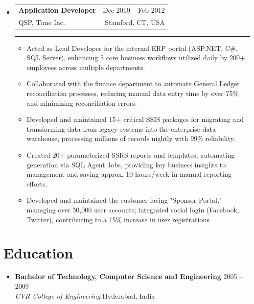 \documentclass[12pt]{article}
\makeatletter
\newcommand{\CompanyFour}{QSP, Time Inc.}
\newcommand{\CollegeName}{CVR College of Engineering}
\newcommand{\resumeItem}[1]{
  \item\small{
    {#1 \vspace{-2pt}}
  }
}
\newcommand{\resumeSubheading}[4]{
  \item %
    \begin{tabular*}{0.97\textwidth}[t]{l@{\extracolsep{\fill}}r}
       {\textbf{#1}} & \small{#2} \\ 
       {\small#3} & \small {#4} \\ 
    \end{tabular*} \vspace{2pt} %
    \noindent\rule{0.97\textwidth}{0.4pt} \vspace{-4pt} %
}
\newcommand{\resumeItemListStart}{\begin{itemize}[leftmargin=0.25in]} %
\newcommand{\resumeItemListEnd}{\end{itemize}\vspace{-5pt}}
\makeatother
\begin{document}
\begin{itemize}[leftmargin=0in, label={}]
    \resumeSubheading
      {Application Developer}{Dec 2010 – Feb 2012}
      {{\CompanyFour}}{Stamford, CT, USA}
      \resumeItemListStart
        \resumeItem{Acted as Lead Developer for the internal ERP portal (ASP.NET, C\#, SQL Server), enhancing 5 core business workflows utilized daily by 200+ employees across multiple departments.}
        \resumeItem{Collaborated with the finance department to automate General Ledger reconciliation processes, reducing manual data entry time by over 75\% and minimizing reconciliation errors.}
        \resumeItem{Developed and maintained 15+ critical SSIS packages for migrating and transforming data from legacy systems into the enterprise data warehouse, processing millions of records nightly with 99\% reliability.}
        \resumeItem{Created 20+ parameterized SSRS reports and templates, automating generation via SQL Agent Jobs, providing key business insights to management and saving approx. 10 hours/week in manual reporting efforts.}
        \resumeItem{Developed and maintained the customer-facing "Sponsor Portal," managing over 50,000 user accounts; integrated social login (Facebook, Twitter), contributing to a 15\% increase in user registrations.}
      \resumeItemListEnd %

\end{itemize} %
\vspace{-10pt}
\section{Education}
\vspace{1pt} %
\begin{itemize}[leftmargin=0.28in, rightmargin=0.22in, label={}] %
    \item %
        \textbf{Bachelor of Technology, Computer Science and Engineering} \hfill {2005 – 2009} \\ %
        \textit{{\CollegeName}} \hfill {Hyderabad, India} %
\end{itemize}
\end{document}
